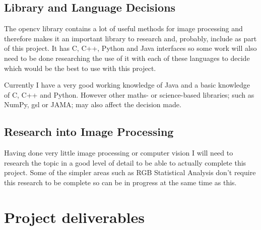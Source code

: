 \documentclass[11pt,fleqn,twoside]{article}
\begin{document}
\subsection{Library and Language Decisions}
The \gls{opencv} library contains a lot of useful methods for image processing and therefore makes it an important library to research and, probably, include as part of this project. It has C, C++, Python and Java interfaces so some work will also need to be done researching the use of it with each of these languages to decide which would be the best to use with this project. 

Currently I have a very good working knowledge of Java and a basic knowledge of C, C++ and Python. However other maths- or science-based libraries; such as NumPy, \gls{gsl} or JAMA; may also affect the decision made.

\subsection{Research into Image Processing}
Having done very little image processing or computer vision I will need to research the topic in a good level of detail to be able to actually complete this project. Some of the simpler areas such as RGB Statistical Analysis don't require this research to be complete so can be in progress at the same time as this.



\section{Project deliverables}


\end{document}
